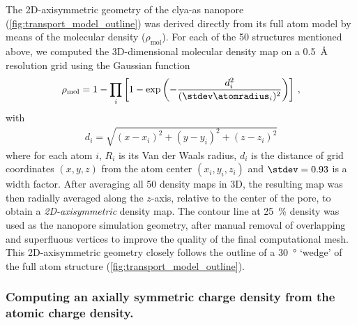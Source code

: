 The 2D-axisymmetric geometry of the \gls{clya-as} nanopore (\cref{fig:transport_model_outline}) was derived
directly from its full atom model by means of the molecular density ($\rho_\text{mol}$). For each of the 50
structures mentioned above, we computed the 3D-dimensional molecular density map on a \SI{0.5}{\angstrom}
resolution grid using the Gaussian function~\cite{Li-2013}
%
\begin{align}\label{eq:denspore}
  \rho_\text{mol} = 1 - \displaystyle\prod_{i} \left[ 1 - 
    \exp{\left(-\dfrac{d_i^2}{(\stdev\atomradius_{i})^2}\right)} \right]
    \text{\,,}
\end{align}
%
with
%
\begin{align}
  d_i = \sqrt{(x-x_i)^2 + (y-y_i)^2 + (z-z_i)^2}
\end{align}
%
where for each atom $i$, $R_i$ is its Van der Waals radius, $d_i$ is the distance of grid coordinates $(x, y,
z)$ from the atom center $(x_i, y_i, z_i)$ and $\stdev = 0.93$ is a width factor. After averaging all 50
density maps in 3D, the resulting map was then radially averaged along the $z$-axis, relative to the center of
the pore, to obtain a \emph{2D-axisymmetric} density map. The contour line at \SI{25}{\percent} density was
used as the nanopore simulation geometry, after manual removal of overlapping and superfluous vertices to
improve the quality of the final computational mesh. This 2D-axisymmetric geometry closely follows the outline
of a \SI{30}{\degree} `wedge' of the full atom structure (\cref{fig:transport_model_outline}).

\subsubsection{Computing an axially symmetric charge density from the atomic charge density.}
%


